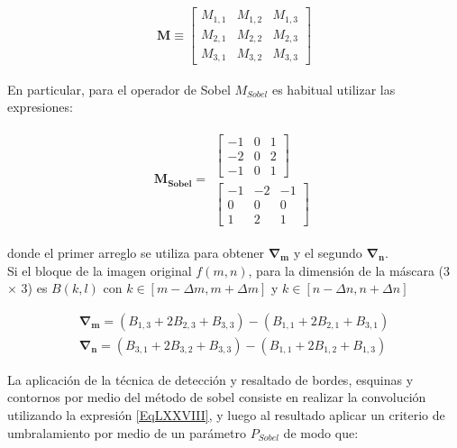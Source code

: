 \begin{eqnarray}
	\mathbf{M} \equiv \left[ \begin{array}{ccc}  M_{1, 1} & M_{1, 2} & M_{1, 3}  \\  M_{2, 1} & M_{2, 2} & M_{2, 3} \\ 
	M_{3, 1} & M_{3, 2} & M_{3, 3} \end{array} \right]
\label{EqLXXVI}
\end{eqnarray}

En particular, para el operador de Sobel $M_{Sobel}$ es habitual utilizar las expresiones:

\begin{eqnarray}
	\mathbf{M_{Sobel}} = \begin{array}{c} \left[ \begin{array}{ccc}  -1 & 0 & 1  \\  -2 & 0 & 2 \\ -1 & 0 & 1 \end{array} \right] 
	\\ %
	\left[ \begin{array}{ccc}  -1 & -2 & -1  \\  0 & 0 & 0 \\ 1 & 2 & 1 \end{array} \right] \end{array}
\label{EqLXXVII}
\end{eqnarray}

donde el primer arreglo se utiliza para obtener $\mathbf{\nabla_{m}}$ y el segundo $\mathbf{\nabla_{n}}$. \\

Si el bloque de la imagen original $f(m, n)$, para la dimensi\'on de la 
m\'ascara (3 $\times$ 3) es $B(k, l)$ con 
$k \in [m - \Delta m, m + \Delta m]$ y $k \in [n - \Delta n, n + \Delta n]$

\begin{eqnarray}
	\mathbf{\nabla_{m}} = \left( B_{1, 3} + 2 B_{2, 3} + B_{3, 3} \right) -  
\left( B_{1, 1} + 2 B_{2, 1} + B_{3, 1} \right) 
	\\ \nonumber
	\mathbf{\nabla_{n}} = \left( B_{3, 1} + 2 B_{3, 2} + B_{3, 3} \right)
 -  \left( B_{1, 1} + 2 B_{1, 2} + B_{1, 3} \right) 
\label{EqLXXVIII}
\end{eqnarray}



La aplicaci\'on de la t\'ecnica de detecci\'on y resaltado de bordes, esquinas y contornos por medio del m\'etodo de sobel consiste en 
realizar la convoluci\'on utilizando la expresi\'on \ref{EqLXXVIII}, y luego al resultado aplicar un criterio de umbralamiento por 
medio de un par\'ametro $P_{Sobel}$ de modo que:

